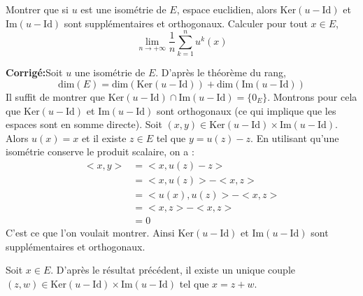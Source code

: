 \documentclass[a4paper,twoside,french,11pt]{VcCours}
\newcommand{\corr}{\textbf{Corrigé:}}
\begin{document}
\begin{Exercice}{} Montrer que si $u$ est une isométrie de $E$, espace euclidien, alors $\textrm{Ker}(u-\textrm{Id})$ et $\textrm{Im}(u-\textrm{Id})$ sont supplémentaires et orthogonaux. Calculer pour tout $x \in E$,
$$  \lim_{n \rightarrow + \infty} \dfrac{1}{n} \sum_{k=1}^n u^k(x)$$
\end{Exercice}

\corr Soit $u$ une isométrie de $E$. D'après le théorème du rang,
$$ \textrm{dim}(E) = \textrm{dim}(\textrm{Ker}(u-\textrm{Id})) + \textrm{dim}(\textrm{Im}(u-\textrm{Id}))$$
Il suffit de montrer que $\textrm{Ker}(u-\textrm{Id}) \cap \textrm{Im}(u-\textrm{Id})= \lbrace 0_E \rbrace$. Montrons pour cela que   $\textrm{Ker}(u-\textrm{Id})$ et $\textrm{Im}(u-\textrm{Id})$ sont orthogonaux (ce qui implique que les espaces sont en somme directe). Soit $(x,y) \in \textrm{Ker}(u-\textrm{Id}) \times \textrm{Im}(u-\textrm{Id})$. Alors $u(x)=x$ et il existe $z \in E$ tel que $y=u(z)-z$. En utilisant qu'une isométrie conserve le produit scalaire, on a :
\begin{align*}
<x,y> & = <x,u(z)-z> \\
& = <x,u(z)>-<x,z> \\
& = <u(x),u(z)> - <x,z> \\
& = <x,z>-<x,z> \\
& = 0
\end{align*}
C'est ce que l'on voulait montrer. Ainsi $\textrm{Ker}(u-\textrm{Id})$ et $\textrm{Im}(u-\textrm{Id})$ sont supplémentaires et orthogonaux. 


Soit $x \in E$. D'après le résultat précédent, il existe un unique couple $(z,w) \in \textrm{Ker}(u-\textrm{Id}) \times \textrm{Im}(u-\textrm{Id})$ tel que $x=z+w$.
\end{document}
